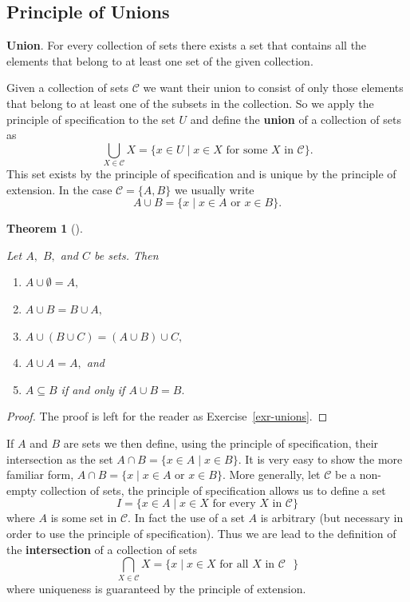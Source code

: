 \documentclass[
  letterpaper,
  10pt,
  reqno,
  twopage,
  openany]{book}
\providecommand{\tightlist}{%
  \setlength{\itemsep}{0pt}\setlength{\parskip}{0pt}}\usepackage{longtable,booktabs,array}
\theoremstyle{plain}
\theoremstyle{definition}
\theoremstyle{definition}
\theoremstyle{definition}
\theoremstyle{plain}
\theoremstyle{plain}
\newtheorem{theorem}{Theorem}[chapter]
\theoremstyle{remark}
\begin{document}
\hypertarget{principle-of-unions}{%
\subsection{Principle of Unions}\label{principle-of-unions}}

\textbf{Union}. For every collection of sets there exists a set that
contains all the elements that belong to at least one set of the given
collection.

Given a collection of sets \(\mathcal{C}\) we want their union to
consist of only those elements that belong to at least one of the
subsets in the collection. So we apply the principle of specification to
the set \(U\) and define the  \textbf{union} of a
collection of sets as \[
\bigcup_{X\in \mathcal{C}}X=\{x\in U \mid x\in X \text{ for some $X$ in $\mathcal{C}$\}}.
\] This set exists by the principle of specification and is unique by
the principle of extension. In the case \(\mathcal{C}=\{A, B\}\) we
usually write \[
A\cup B=\{x \mid x\in A \text{ or } x\in B\}.
\]

\leavevmode{}%
\begin{theorem}[]\label{thm-unions}

Let \(A,\) \(B,\) and \(C\) be sets. Then

\begin{enumerate}
\def\labelenumi{\arabic{enumi}.}
\tightlist
\item
  \(A\cup \emptyset =A ,\)
\item
  \(A\cup B=B\cup A,\)
\item
  \(A\cup (B \cup C) =(A\cup B)\cup C,\)
\item
  \(A \cup A =A,\) and
\item
  \(A\subseteq B\) if and only if \(A\cup B=B.\)
\end{enumerate}

\end{theorem}

\begin{proof}

The proof is left for the reader as Exercise~\ref{exr-unions}.

\end{proof}

If \(A\) and \(B\) are sets we then define, using the principle of
specification, their intersection as the set
\(A \cap B=\{x\in A \mid x\in B\}.\) It is very easy to show the more
familiar form, \(A\cap B=\{x \mid x\in A \text{ or } x\in B\}.\) More
generally, let \(\mathcal{C}\) be a non-empty collection of sets, the
principle of specification allows us to define a set \[
I=\{x \in A \mid x\in X \text{ for every $X$ in $\mathcal{C}$}\}
\] where \(A\) is some set in \(\mathcal{C}.\) In fact the use of a set
\(A\) is arbitrary (but necessary in order to use the principle of
specification). Thus we are lead to the definition of the
 \textbf{intersection} of a collection of sets \[
\bigcap_{X\in \mathcal{C}} X=\{x\mid x\in X \text{ for all $X$ in 
$\mathcal{C}$ }\}
\] where uniqueness is guaranteed by the principle of extension.
\end{document}
